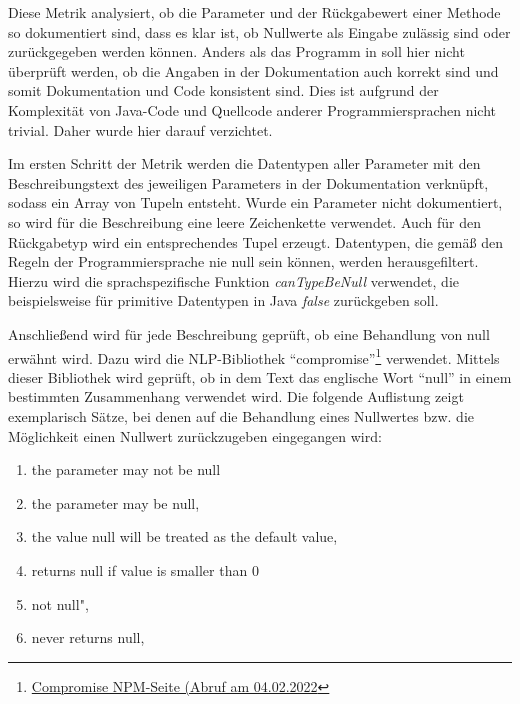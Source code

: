  Diese Metrik analysiert, ob die Parameter und der Rückgabewert einer Methode so dokumentiert sind, dass es klar ist, ob Nullwerte als Eingabe zulässig sind oder zurückgegeben werden können. Anders als das Programm in \cite[S. 260 ff.]{@tComment:TestingJavadocCommentstoDetectComment-CodeInconsistencies} soll hier nicht überprüft werden, ob die Angaben in der Dokumentation auch korrekt sind und somit Dokumentation und Code konsistent sind. Dies ist aufgrund der Komplexität von Java-Code und Quellcode anderer Programmiersprachen nicht trivial. Daher wurde hier darauf verzichtet.
 
 Im ersten Schritt der Metrik werden die Datentypen aller Parameter mit den Beschreibungstext des jeweiligen Parameters in der Dokumentation verknüpft, sodass ein Array von Tupeln entsteht. Wurde ein Parameter nicht dokumentiert, so wird für die Beschreibung eine leere Zeichenkette verwendet. Auch für den Rückgabetyp wird ein entsprechendes Tupel erzeugt. Datentypen, die gemäß den Regeln der Programmiersprache nie null sein können, werden herausgefiltert. Hierzu wird die sprachspezifische Funktion \textit{canTypeBeNull} verwendet, die beispielsweise für primitive Datentypen in Java \textit{false} zurückgeben soll. 
 
 Anschließend wird für jede Beschreibung geprüft, ob eine Behandlung von null erwähnt wird. Dazu wird die \ac{NLP}-Bibliothek \enquote{compromise}\footnote{\href{https://www.npmjs.com/package/compromise?activeTab=readme}{Compromise NPM-Seite (Abruf am 04.02.2022}} verwendet. Mittels dieser Bibliothek wird geprüft, ob in dem Text das englische Wort \enquote{null} in einem bestimmten Zusammenhang verwendet wird. Die folgende Auflistung zeigt exemplarisch Sätze, bei denen auf die Behandlung eines Nullwertes bzw. die Möglichkeit einen Nullwert zurückzugeben eingegangen wird:
 \begin{enumerate}
      \item  the parameter may not be null
       \item  the parameter may be null,
       \item  the value null will be treated as the default value,
       
      \item  returns null if value is smaller than 0
       \item  not null",
       \item  never returns null,
 \end{enumerate}
 
